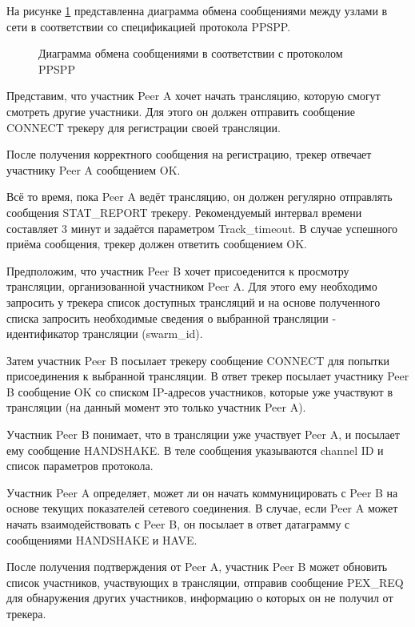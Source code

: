 		На рисунке \ref{img:message-flow} представленна диаграмма обмена сообщениями между узлами в сети в
		соответствии со спецификацией протокола PPSPP.

		\begin{figure}[H]
			\caption{Диаграмма обмена сообщениями в соответствии с протоколом PPSPP}
			\label{img:message-flow}
		\end{figure}

		Представим, что участник Peer A хочет начать трансляцию, которую смогут смотреть другие участники.
		Для этого он должен отправить сообщение CONNECT трекеру для регистрации своей трансляции.

		После получения корректного сообщения на регистрацию, трекер отвечает участнику Peer A сообщением OK.

		Всё то время, пока Peer A ведёт трансляцию, он должен регулярно отправлять сообщения
		STAT\_REPORT трекеру. Рекомендуемый интервал времени составляет 3 минут и задаётся параметром
		Track\_timeout. В случае успешного приёма сообщения, трекер должен ответить сообщением OK.

		Предположим, что участник Peer B хочет присоеденится к просмотру трансляции, организованной участником
		Peer A. Для этого ему необходимо запросить у трекера список доступных трансляций и на основе
		полученного списка запросить необходимые сведения о выбранной трансляции - идентификатор трансляции
		(swarm\_id).

		Затем участник Peer B посылает трекеру сообщение CONNECT для попытки присоединения к выбранной
		трансляции. В ответ трекер посылает участнику Peer B сообщение OK со списком IP-адресов
		участников, которые уже участвуют в трансляции (на данный момент это только участник Peer A).

		Участник Peer B понимает, что в трансляции уже участвует Peer A, и посылает ему сообщение
		HANDSHAKE. В теле сообщения указываются channel ID и список параметров протокола.

		Участник Peer A определяет, может ли он начать коммуницировать с Peer B на основе текущих
		показателей сетевого соединения. В случае, если Peer A может начать взаимодействовать с Peer B,
		он посылает в ответ датаграмму с сообщениями HANDSHAKE и HAVE.

		После получения подтверждения от Peer A, участник Peer B может обновить список участников,
		участвующих в трансляции, отправив сообщение PEX\_REQ для обнаружения других участников, информацию о
		которых он не получил от трекера.

